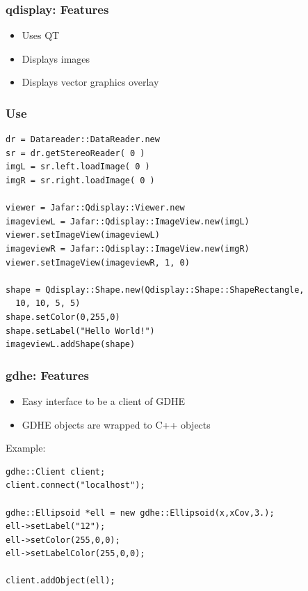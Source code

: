 \documentclass[compress]{beamer}
\begin{document}

\begin{frame}
  \frametitle{qdisplay: Features}
  \begin{itemize}
   \item<1-> Uses QT
   \item<2-> Displays images
   \item<3-> Displays vector graphics overlay 
  \end{itemize}
\end{frame}

\begin{frame}[fragile]
  \frametitle{Use}
  \begin{lstlisting}
dr = Datareader::DataReader.new
sr = dr.getStereoReader( 0 )
imgL = sr.left.loadImage( 0 )
imgR = sr.right.loadImage( 0 )

viewer = Jafar::Qdisplay::Viewer.new
imageviewL = Jafar::Qdisplay::ImageView.new(imgL)
viewer.setImageView(imageviewL)
imageviewR = Jafar::Qdisplay::ImageView.new(imgR)
viewer.setImageView(imageviewR, 1, 0)

shape = Qdisplay::Shape.new(Qdisplay::Shape::ShapeRectangle,
  10, 10, 5, 5)
shape.setColor(0,255,0)
shape.setLabel("Hello World!")
imageviewL.addShape(shape)
  \end{lstlisting}
\end{frame}


\begin{frame}[fragile]
  \frametitle{gdhe: Features}
  \begin{itemize}
   \item<1-> Easy interface to be a client of GDHE
   \item<2-> GDHE objects are wrapped to C++ objects
  \end{itemize}

  Example:
  \begin{lstlisting}
gdhe::Client client;
client.connect("localhost");

gdhe::Ellipsoid *ell = new gdhe::Ellipsoid(x,xCov,3.);
ell->setLabel("12");
ell->setColor(255,0,0);
ell->setLabelColor(255,0,0);

client.addObject(ell);
  \end{lstlisting}


\end{frame}


\end{document}
